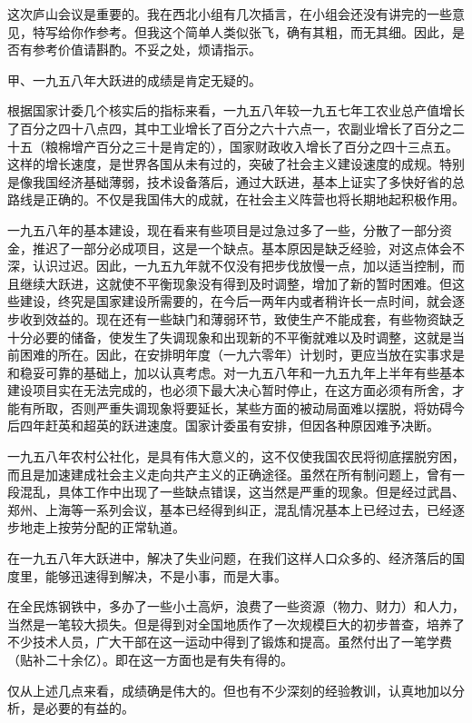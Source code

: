 \begin{maonote}

这次庐山会议是重要的。我在西北小组有几次插言，在小组会还没有讲完的一些意见，特写给你作参考。但我这个简单人类似张飞，确有其粗，而无其细。因此，是否有参考价值请斟酌。不妥之处，烦请指示。

甲、一九五八年大跃进的成绩是肯定无疑的。

根据国家计委几个核实后的指标来看，一九五八年较一九五七年工农业总产值增长了百分之四十八点四，其中工业增长了百分之六十六点一，农副业增长了百分之二十五（粮棉增产百分之三十是肯定的），国家财政收入增长了百分之四十三点五。这样的增长速度，是世界各国从未有过的，突破了社会主义建设速度的成规。特别是像我国经济基础薄弱，技术设备落后，通过大跃进，基本上证实了多快好省的总路线是正确的。不仅是我国伟大的成就，在社会主义阵营也将长期地起积极作用。

一九五八年的基本建设，现在看来有些项目是过急过多了一些，分散了一部分资金，推迟了一部分必成项目，这是一个缺点。基本原因是缺乏经验，对这点体会不深，认识过迟。因此，一九五九年就不仅没有把步伐放慢一点，加以适当控制，而且继续大跃进，这就使不平衡现象没有得到及时调整，增加了新的暂时困难。但这些建设，终究是国家建设所需要的，在今后一两年内或者稍许长一点时间，就会逐步收到效益的。现在还有一些缺门和薄弱环节，致使生产不能成套，有些物资缺乏十分必要的储备，使发生了失调现象和出现新的不平衡就难以及时调整，这就是当前困难的所在。因此，在安排明年度（一九六零年）计划时，更应当放在实事求是和稳妥可靠的基础上，加以认真考虑。对一九五八年和一九五九年上半年有些基本建设项目实在无法完成的，也必须下最大决心暂时停止，在这方面必须有所舍，才能有所取，否则严重失调现象将要延长，某些方面的被动局面难以摆脱，将妨碍今后四年赶英和超英的跃进速度。国家计委虽有安排，但因各种原因难予决断。

一九五八年农村公社化，是具有伟大意义的，这不仅使我国农民将彻底摆脱穷困，而且是加速建成社会主义走向共产主义的正确途径。虽然在所有制问题上，曾有一段混乱，具体工作中出现了一些缺点错误，这当然是严重的现象。但是经过武昌、郑州、上海等一系列会议，基本已经得到纠正，混乱情况基本上已经过去，已经逐步地走上按劳分配的正常轨道。

在一九五八年大跃进中，解决了失业问题，在我们这样人口众多的、经济落后的国度里，能够迅速得到解决，不是小事，而是大事。

在全民炼钢铁中，多办了一些小土高炉，浪费了一些资源（物力、财力）和人力，当然是一笔较大损失。但是得到对全国地质作了一次规模巨大的初步普查，培养了不少技术人员，广大干部在这一运动中得到了锻炼和提高。虽然付出了一笔学费（贴补二十余亿）。即在这一方面也是有失有得的。

仅从上述几点来看，成绩确是伟大的。但也有不少深刻的经验教训，认真地加以分析，是必要的有益的。


\end{maonote}
